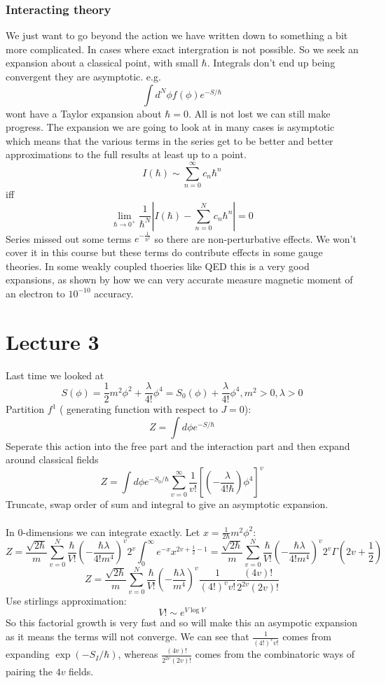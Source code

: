 \documentclass{article}
\begin{document}
\subsubsection{Interacting theory}
We just want to go beyond the action we have written down to something a bit more complicated. In cases where exact intergration is not possible. So we seek an expansion about a classical point, with small $\hbar$. Integrals don't end up being convergent they are asymptotic. e.g.
$$
\int d^N \phi f(\phi) e^{-S/\hbar}
$$
wont have a Taylor expansion about $\hbar = 0$. All is not lost we can still make progress. The expansion we are going to look at in many cases is asymptotic which means that the various terms in the series get to be better and better approximations to the full results at least up to a point.
$$
I(\hbar) \sim \sum_{n=0}^{\infty} c_n \hbar^n
$$
iff
$$
\lim_{\hbar \rightarrow 0^+} \frac{1}{\hbar^N} | I(\hbar) - \sum_{n=0}^N c_n \hbar^n | = 0
$$
Series missed out some terms $e^{-\frac{1}{\hbar^2}}$ so there are non-perturbative effects. We won't cover it in this course but these terms do contribute effects in some gauge theories. In some weakly coupled thoeries like QED this is a very good expansions, as shown by how we can very accurate measure magnetic moment of an electron to $10^{-10}$ accuracy.
\section{Lecture 3}
Last time we looked at
$$S(\phi) = \frac{1}{2} m^2 \phi^2 + \frac{\lambda}{4!} \phi^4 = S_0(\phi) + \frac{\lambda}{4!} \phi^4, m^2 > 0, \lambda >0$$
Partition $f^1$ ( generating function with respect to $J=0$):
$$
Z = \int d\phi e^{- S/ \hbar}
$$
Seperate this action into the free part and the interaction part and then expand around classical fields
$$
Z = \int d \phi e^{- S_0 / \hbar} \sum_{v=0}^{\infty} \frac{1}{v!} [ (- \frac{\lambda}{4!\hbar}) \phi^4 ]^v
$$
Truncate, swap order of sum and integral to give an asymptotic expansion.\\\\
In 0-dimensions we can integrate exactly. Let $x = \frac{1}{2\hbar} m^2 \phi^2$:
$$
Z = \frac{\sqrt{2\hbar}}{m} \sum_{v=0}^N \frac{\hbar}{V!} (- \frac{\hbar \lambda}{4! m^4})^v 2^v \int_0^{\infty} e^{-x} x^{2v + \frac{1}{2} -1} = \frac{\sqrt{2\hbar}}{m} \sum_{v=0}^N \frac{\hbar}{V!} (- \frac{\hbar \lambda}{4! m^4})^v 2^v \Gamma(2v + \frac{1}{2})
$$
$$
Z =  \frac{\sqrt{2\hbar}}{m} \sum_{v=0}^N \frac{\hbar}{V!} (- \frac{\hbar \lambda}{ m^4})^v \frac{1}{(4!)^v v!} \frac{(4v)!}{2^{2v}(2v)!}$$
Use stirlings approximation:
$$
V! \sim e^{V \log V}
$$
So this factorial growth is very fast and so will make this an asympotic expansion as it means the terms will not converge. We can see that $\frac{1}{(4!)^v v!} $ comes from expanding $\exp( - S_I / \hbar)$, whereas $\frac{(4v)!}{2^{2v}(2v)!}$ comes from the combinatoric ways of pairing the $4v$ fields.\\\\
\end{document}
